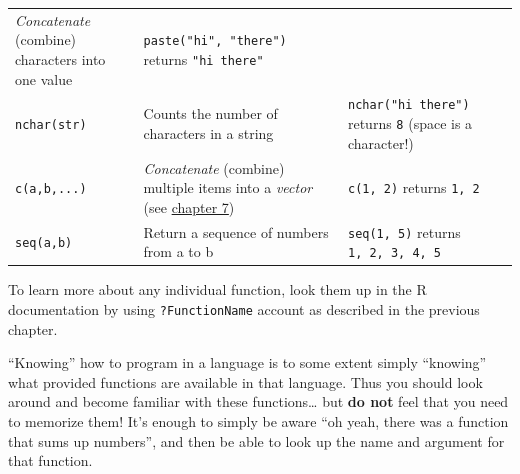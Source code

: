 \documentclass[]{book}
\theoremstyle{definition}
\theoremstyle{definition}
\theoremstyle{remark}
\begin{document}
\begin{longtable}[]{@{}lll@{}}
\begin{minipage}[t]{0.30\columnwidth}
\emph{Concatenate} (combine) characters into one value\strut
\end{minipage} & \begin{minipage}[t]{0.42\columnwidth}\raggedright\strut
\texttt{paste("hi",\ "there")} returns \texttt{"hi\ there"}\strut
\end{minipage}\tabularnewline
\begin{minipage}[t]{0.19\columnwidth}\raggedright\strut
\texttt{nchar(str)}\strut
\end{minipage} & \begin{minipage}[t]{0.30\columnwidth}\raggedright\strut
Counts the number of characters in a string\strut
\end{minipage} & \begin{minipage}[t]{0.42\columnwidth}\raggedright\strut
\texttt{nchar("hi\ there")} returns \texttt{8} (space is a
character!)\strut
\end{minipage}\tabularnewline
\begin{minipage}[t]{0.19\columnwidth}\raggedright\strut
\texttt{c(a,b,...)}\strut
\end{minipage} & \begin{minipage}[t]{0.30\columnwidth}\raggedright\strut
\emph{Concatenate} (combine) multiple items into a \emph{vector} (see
\protect\hyperlink{vectors}{chapter 7})\strut
\end{minipage} & \begin{minipage}[t]{0.42\columnwidth}\raggedright\strut
\texttt{c(1,\ 2)} returns \texttt{1,\ 2}\strut
\end{minipage}\tabularnewline
\begin{minipage}[t]{0.19\columnwidth}\raggedright\strut
\texttt{seq(a,b)}\strut
\end{minipage} & \begin{minipage}[t]{0.30\columnwidth}\raggedright\strut
Return a sequence of numbers from a to b\strut
\end{minipage} & \begin{minipage}[t]{0.42\columnwidth}\raggedright\strut
\texttt{seq(1,\ 5)} returns \texttt{1,\ 2,\ 3,\ 4,\ 5}\strut
\end{minipage}\tabularnewline
\bottomrule
\end{longtable}

To learn more about any individual function, look them up in the R
documentation by using \texttt{?FunctionName} account as described in
the previous chapter.

``Knowing'' how to program in a language is to some extent simply
``knowing'' what provided functions are available in that language. Thus
you should look around and become familiar with these functions\ldots{}
but \textbf{do not} feel that you need to memorize them! It's enough to
simply be aware ``oh yeah, there was a function that sums up numbers'',
and then be able to look up the name and argument for that function.
\end{document}
